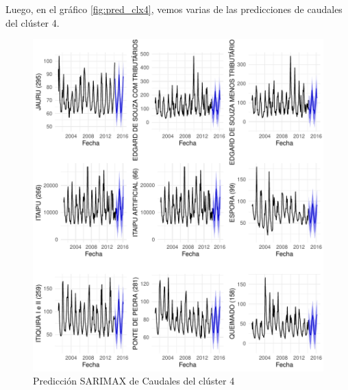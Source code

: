 \documentclass[12pt,oneside]{book}\usepackage[]{graphicx}\usepackage[]{color}
\makeatletter
\def\maxwidth{ %
  \ifdim\Gin@nat@width>\linewidth
    \linewidth
  \else
    \Gin@nat@width
  \fi
}
\newenvironment{knitrout}{}{} %
\theoremstyle{definition} %
\makeatother
\begin{document}
Luego, en el gráfico \ref{fig:pred_clx4}, vemos varias de las predicciones de caudales del clúster 4.

\begin{knitrout}
\color{fgcolor}\begin{figure}[h]

{\centering \includegraphics[width=\maxwidth]{figure/unnamed-chunk-117-1} 

}

\caption{\label{fig:pred_clx4} Predicción SARIMAX de Caudales del clúster 4}\label{fig:unnamed-chunk-117}
\end{figure}


\end{knitrout}





\cleardoublepage
% 





\end{document}
